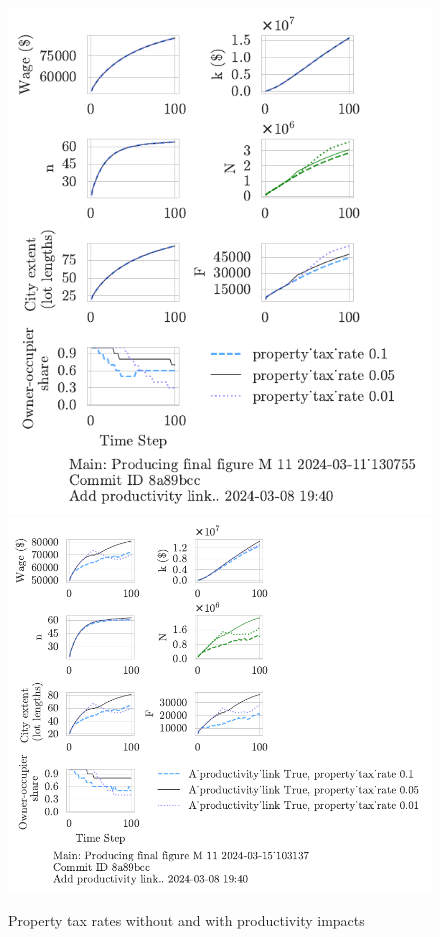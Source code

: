 {\begin{figure}[h!tb] 
    \centering
    \includegraphics[scale=.75, trim={0 1.4cm .8cm 0},clip]{fig/property_tax_rate-Main-130755.pdf} 
    \includegraphics[scale=.75, trim={0 1.4cm 4.75cm 0},clip]{fig/With-productivity_link-property_tax-103137.pdf} 
    \caption{Property tax rates without and with productivity impacts}
    \label{fig:Productivity_link_W-WO-property_tax}
\end{figure}

}
